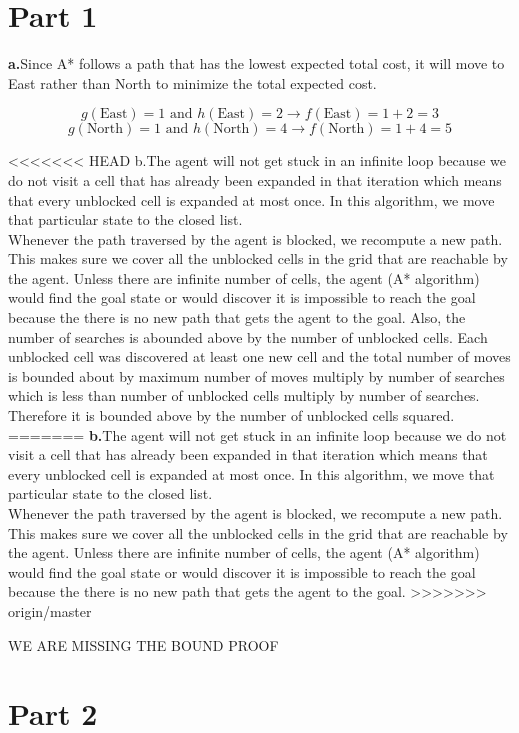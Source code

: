 \documentclass{article}
\begin{document}
\section*{Part 1}
\textbf{a.}\quad Since A* follows a path that has the lowest expected total cost, it will move to East rather than North to minimize the total expected cost. 

$$g(\text{East})=1 \text{ and } h(\text{East}) = 2 \rightarrow f(\text{East})=1+2=3 $$
$$ g(\text{North})=1 \text{ and } h(\text{North})=4 \rightarrow f(\text{North})=1+4=5 $$

<<<<<<< HEAD
b.The agent will not get stuck in an infinite loop because we do not visit a cell that has already been expanded in that iteration which means that every unblocked cell is expanded at most once. In this algorithm, we move that particular state to the closed list.\\
Whenever the path traversed by the agent is blocked, we recompute a new path. This makes sure we cover all the unblocked cells in the grid that are reachable by the agent. Unless there are infinite number of cells, the agent (A* algorithm) would find the goal state or would discover it is impossible to reach the goal because the there is no new path that gets the agent to the goal.  Also, the number of searches is abounded above by the number of unblocked cells. Each unblocked cell was discovered at least one new cell and the total number of moves is bounded about by maximum number of moves multiply by number of searches which is less than number of unblocked cells multiply by number of searches. Therefore it is bounded above by the number of unblocked cells squared.
=======
\textbf{b.}\quad The agent will not get stuck in an infinite loop because we do not visit a cell that has already been expanded in that iteration which means that every unblocked cell is expanded at most once. In this algorithm, we move that particular state to the closed list.\\
Whenever the path traversed by the agent is blocked, we recompute a new path. This makes sure we cover all the unblocked cells in the grid that are reachable by the agent. Unless there are infinite number of cells, the agent (A* algorithm) would find the goal state or would discover it is impossible to reach the goal because the there is no new path that gets the agent to the goal.
>>>>>>> origin/master

{\huge{WE ARE MISSING THE BOUND PROOF}}


\section*{Part 2}
\end{document}
